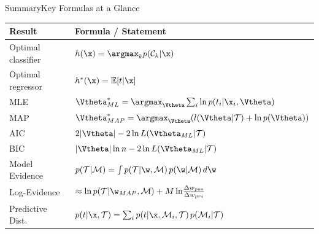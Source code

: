 \begin{frame}{Summary}{Key Formulas at a Glance}
  \begin{center}
  \begin{tabular}{ll}
    \toprule
    \textbf{Result} & \textbf{Formula / Statement}\\
    \midrule
    Optimal classifier & $h(\x)=\argmax_{k} p(\mathcal{C}_k|\x)$\\
    Optimal regressor & $h^*(\x) = \mathbb{E}[t|\x]$\\
    MLE & $\Vtheta^*_{ML} = \argmax_{\Vtheta} \sum_i \ln p(t_i|\x_i,\Vtheta)$\\
    MAP & $\Vtheta^*_{MAP} = \argmax_{\Vtheta} (l(\Vtheta|\mathcal{T})+\ln p(\Vtheta))$\\
    AIC & $2|\Vtheta| - 2\ln L(\Vtheta_{ML}|\mathcal{T})$\\
    BIC & $|\Vtheta|\ln n - 2\ln L(\Vtheta_{ML}|\mathcal{T})$\\
    Model Evidence & $p(\mathcal{T}|\mathcal{M}) = \int p(\mathcal{T}|\w,\mathcal{M})\,p(\w|\mathcal{M})\,d\w$\\
    Log-Evidence & $\approx \ln p(\mathcal{T}|\w_{MAP},\mathcal{M}) + M\ln\!\frac{\Delta w_{pos}}{\Delta w_{pri}}$\\
    Predictive Dist.\ & $p(t|\x,\mathcal{T}) = \sum_i p(t|\x,\mathcal{M}_i,\mathcal{T})\,p(\mathcal{M}_i|\mathcal{T})$\\
    \bottomrule
  \end{tabular}
  \end{center}
\end{frame}

%
